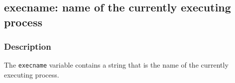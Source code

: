 \clearpage
{}
{}
\label{vars:arg09}
\subsection*{execname: name of the currently executing process}

\subsubsection*{Description}

The \verb|execname| variable contains a string that is the name of the
currently executing process.


